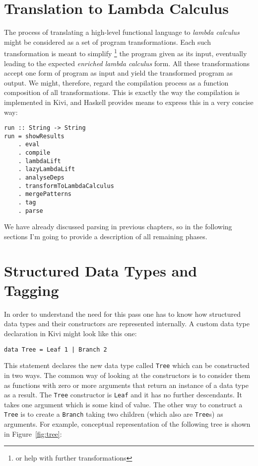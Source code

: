 \documentclass[12pt,a4paper]{report}
\begin{document}
\section{Translation to Lambda Calculus}
The process of translating a high-level functional language to \textit{lambda
calculus} might be considered as a set of program transformations. Each such
transformation is meant to simplify \footnote{or help with further
transformations} the program given as its input, eventually leading to the
expected \textit{enriched lambda calculus} form. All these transformations
accept one form of program as input and yield the transformed program as
output. We might, therefore, regard the compilation process as a function
composition of all transformations. This is exactly the way the compilation is
implemented in Kivi, and Haskell provides means to express this in a very
concise way:

\hspace*{-1.5in}
\begin{lstlisting}[style=haskell]
run :: String -> String
run = showResults
    . eval
    . compile
    . lambdaLift
    . lazyLambdaLift
    . analyseDeps
    . transformToLambdaCalculus
    . mergePatterns
    . tag
    . parse
\end{lstlisting}

We have already discussed parsing in previous chapters, so in the following
sections I'm going to provide a description of all remaining phases.

\section{Structured Data Types and Tagging}
In order to understand the need for this pass one has to know how structured
data types and their constructors are represented internally.
A custom data type declaration in Kivi might look like this one:

\hspace*{-1.5in}
\begin{lstlisting}[style=haskell]
data Tree = Leaf 1 | Branch 2
\end{lstlisting}

This statement declares the new data type called \texttt{Tree} which can be
constructed in two ways. The common way of looking at the constructors is to
consider them as functions with zero or more arguments that return an instance
of a data type as a result. The \texttt{Tree} constructor is \texttt{Leaf} and
it has no further descendants. It takes one argument which is some kind of
value. The other way to construct a \texttt{Tree} is to create a \texttt{Branch}
taking two children (which also are \texttt{Tree}s) as arguments. For example,
conceptual representation of the following tree is shown in Figure~\ref{fig:tree}:
\end{document}
